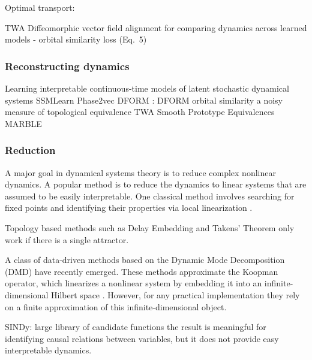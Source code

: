 \documentclass{article}
\theoremstyle{definition} \newtheorem{definition}{Definition}  \newtheorem{example}{Example}
\theoremstyle{remark} \newtheorem{remark}{Remark}
\newcounter{ct}
\begin{document}
Optimal transport: \citep{nejatbakhsh2024comparing} \citep{lipshutz2024disentangling} 


TWA\citep{moriel2024timewarpattend}
Diffeomorphic vector field alignment for comparing dynamics across learned models\citep{chen2024dform}
- orbital similarity loss (Eq.~5)



\subsubsection{Reconstructing dynamics}\label{sec:reconstruction}
Learning interpretable continuous-time models of latent stochastic dynamical systems \citep{duncker2019learning}
SSMLearn \citep{cenedese2022data}
%
Phase2vec \citep{ricci2022phase2vec}
DFORM \citep{chen2024dform}: DFORM orbital similarity a noisy measure of topological equivalence
TWA \citep{moriel2024timewarpattend}
Smooth Prototype Equivalences \citep{friedman2025characterizing}
%
MARBLE \citep{gosztolai2025marble}



\subsubsection{Reduction}\label{sec:reduction} %
A major goal in dynamical systems theory is to reduce complex nonlinear dynamics.
A popular method is to reduce the dynamics to linear systems that are assumed to be easily interpretable.
One classical method involves searching for fixed points and identifying their properties via local linearization \citep{sussillo2013blackbox}.


Topology based methods such as Delay Embedding and Takens' Theorem  only work if there is a single attractor.

A class of data-driven methods based on the Dynamic Mode Decomposition (DMD) \citep{schmid2010dynamic} have recently emerged.
These methods approximate the Koopman operator, which linearizes a nonlinear system by embedding it into an infinite-dimensional Hilbert space \citep{williams2015data,brunton2016extracting}.
However, for any practical implementation they rely on a finite approximation of this infinite-dimensional object.

SINDy: large library of candidate functions \citep{brunton2016discovering, brunton2016sparse, fasel2022ensemble}
 the result is meaningful for identifying causal relations between variables, but it does not provide easy interpretable dynamics.
 
\end{document}
